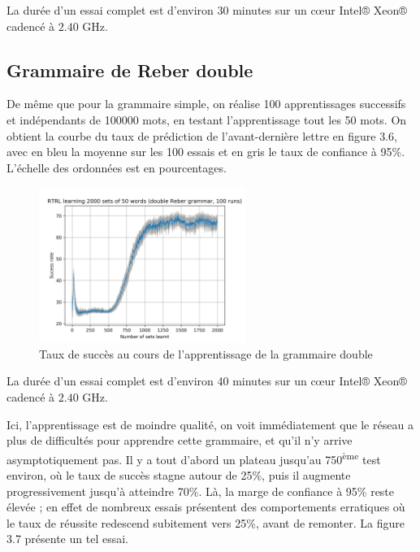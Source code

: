 La durée d'un essai complet est d'environ 30 minutes sur un cœur Intel® Xeon® cadencé à $2.40$ GHz.

\subsection{Grammaire de Reber double}
De même que pour la grammaire simple, on réalise 100 apprentissages successifs et indépendants de 100000 mots, en testant l'apprentissage tout les 50 mots. On obtient la courbe du taux de prédiction de l'avant-dernière lettre en figure 3.6, avec en bleu la moyenne sur les 100 essais et en gris le taux de confiance à 95\%. L'échelle des ordonnées est en pourcentages.

\begin{figure}[!ht]
\begin{center}
\includegraphics[width=0.6\textwidth]{images/SimpleRTRL-r2.png}
\end{center}
\caption{Taux de succès au cours de l'apprentissage de la grammaire double}
\end{figure}

La durée d'un essai complet est d'environ 40 minutes sur un cœur Intel® Xeon® cadencé à $2.40$ GHz.

Ici, l'apprentissage est de moindre qualité, on voit immédiatement que le réseau a plus de difficultés pour apprendre cette grammaire, et qu'il n'y arrive asymptotiquement pas. Il y a tout d'abord un plateau jusqu'au 750\textsuperscript{ème} test environ, où le taux de succès stagne autour de 25\%, puis il augmente progressivement jusqu'à atteindre 70\%. Là, la marge de confiance à 95\% reste élevée ; en effet de nombreux essais présentent des comportements erratiques où le taux de réussite redescend subitement vers 25\%, avant de remonter. La figure 3.7 présente un tel essai.

